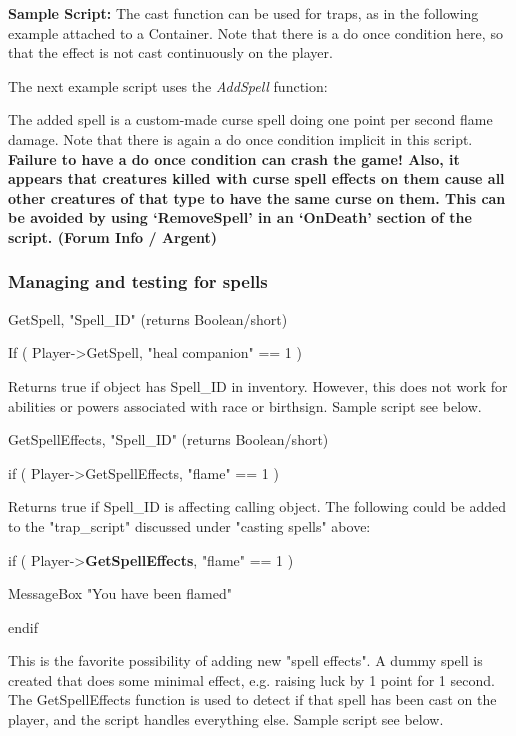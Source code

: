 \textbf{Sample Script:} The cast function can be used for traps, as in
the following example attached to a Container. Note that there is a do
once condition here, so that the effect is not cast continuously on the
player.



The next example script uses the \emph{AddSpell} function:



The added spell is a custom-made curse spell doing one point per second
flame damage. Note that there is again a do once condition implicit in
this script. \textbf{Failure to have a do once condition can crash the
game! Also, it appears that creatures killed with curse spell effects on
them cause all other creatures of that type to have the same curse on
them. This can be avoided by using `RemoveSpell' in an `OnDeath' section
of the script. (Forum Info / Argent)}

\hypertarget{managing-and-testing-for-spells}{%
\subsubsection{Managing and testing for
spells}\label{managing-and-testing-for-spells}}

GetSpell, "Spell\_ID" (returns Boolean/short)

If ( Player-\textgreater GetSpell, "heal companion" == 1 )

Returns true if object has Spell\_ID in inventory. However, this does
not work for abilities or powers associated with race or birthsign.
Sample script see below.

GetSpellEffects, "Spell\_ID" (returns Boolean/short)

if ( Player-\textgreater GetSpellEffects, "flame" == 1 )

Returns true if Spell\_ID is affecting calling object. The following
could be added to the "trap\_script" discussed under "casting spells"
above:

if ( Player-\textgreater{}\textbf{GetSpellEffects}, "flame" == 1 )

MessageBox "You have been flamed"

endif

This is the favorite possibility of adding new "spell effects". A dummy
spell is created that does some minimal effect, e.g. raising luck by 1
point for 1 second. The GetSpellEffects function is used to detect if
that spell has been cast on the player, and the script handles
everything else. Sample script see below.

